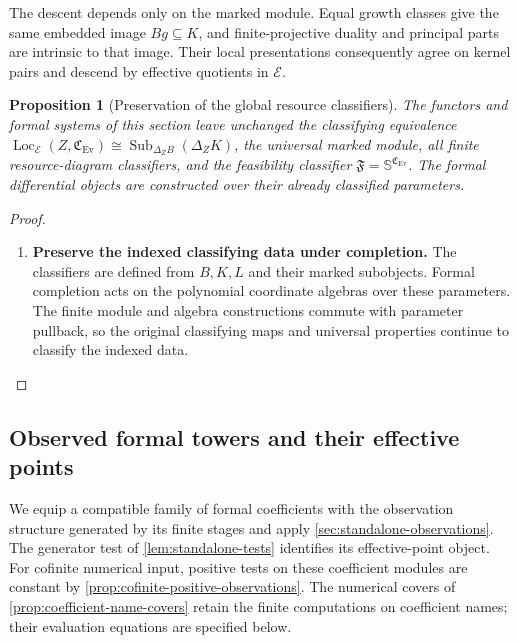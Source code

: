 \documentclass[11pt,a4paper]{article}
\numberwithin{algorithm}{section}
\numberwithin{equation}{section}
\newtheorem{proposition}[proposition]{Proposition}
\theoremstyle{definition}
\theoremstyle{remark}
\theoremstyle{plain}
\newcommand{\E}{\mathcal E}
\newcommand{\Sub}{\operatorname{Sub}}
\newcommand{\Loc}{\operatorname{Loc}}
\newcommand{\Ev}{{\operatorname{Ev}}}
\newcommand{\Cplx}{\mathfrak C_{\Ev}}
\theoremstyle{definition}
\theoremstyle{plain}
\begin{document}
The descent depends only on the marked module. Equal growth
classes give the same embedded image $Bg\subseteq K$, and
finite-projective duality and principal parts are intrinsic to
that image. Their local presentations consequently agree on
kernel pairs and descend by effective quotients in $\E$.


\begin{proposition}[Preservation of the global resource classifiers]
\label{prop:formal-preserves-classifiers}
The functors and formal systems of this section leave unchanged
the classifying equivalence
$\Loc_\E(Z,\Cplx)\cong\Sub_{\Delta_ZB}(\Delta_ZK)$,
the universal marked module, all finite resource-diagram classifiers,
and the feasibility classifier $\mathfrak F=\mathbb S^{\Cplx}$.
The formal differential objects are constructed \emph{over} their
already classified parameters.
\end{proposition}
\begin{proof}\leavevmode
\begin{enumerate}[leftmargin=*,align=left]
\item \textbf{Preserve the indexed classifying data under completion.}
The classifiers are defined from $B,K,L$ and their marked subobjects.
Formal completion acts on the polynomial coordinate algebras over
these parameters. The finite module and algebra constructions commute with
parameter pullback, so the original classifying maps and universal
properties continue to classify the indexed data.
\end{enumerate}
\end{proof}

\subsection{Observed formal towers and their effective points}
\label{sec:formal-effective-points}
We equip a compatible family of formal coefficients with the
observation structure generated by its finite stages and apply
\cref{sec:standalone-observations}. The generator test of
\cref{lem:standalone-tests} identifies its effective-point object.
For cofinite numerical input, positive tests on these coefficient
modules are constant by \cref{prop:cofinite-positive-observations}.
The numerical covers of \cref{prop:coefficient-name-covers} retain
the finite computations on coefficient names; their evaluation
equations are specified below.
\end{document}
